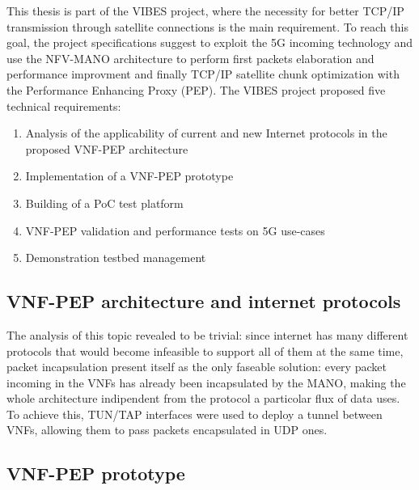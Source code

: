 \documentclass[10pt]{book}
\begin{document}
 This thesis is part of the VIBES project, where the necessity for better TCP/IP
transmission through satellite connections is the main requirement. To
reach this goal, the project specifications suggest to exploit the 5G incoming
technology and use the NFV-MANO architecture to perform first packets
elaboration and performance improvment and finally TCP/IP satellite chunk
optimization with the Performance Enhancing Proxy (PEP). The VIBES project
proposed five technical requirements:
\begin{enumerate}
 \item Analysis of the applicability of current and new Internet protocols in
the proposed VNF-PEP architecture
 \item Implementation of a VNF-PEP prototype
 \item Building of a PoC test platform
 \item VNF-PEP validation and performance tests on 5G use-cases
 \item Demonstration testbed management
\end{enumerate}

\subsection{VNF-PEP architecture and internet protocols}

The analysis of this topic revealed to be trivial: since internet has many
different protocols that would become infeasible to support all of them at the
same time, packet incapsulation present itself as the only faseable solution:
every packet incoming in the VNFs has already been incapsulated by the MANO,
 making the whole architecture indipendent from the protocol a
particolar flux of data uses. To achieve this, TUN/TAP
interfaces were used to deploy a tunnel between VNFs, allowing them to pass
packets encapsulated in UDP ones.

\subsection{VNF-PEP prototype}
\end{document}
